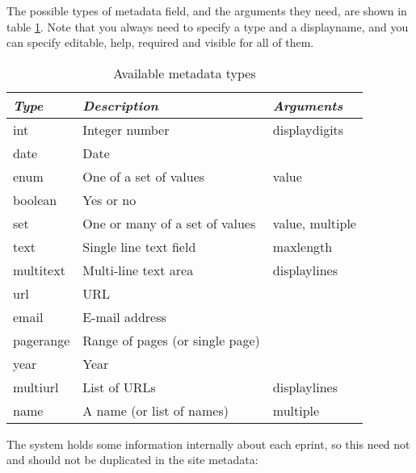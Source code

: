 The possible types of metadata field, and the arguments they need, are shown in table \ref{install_meta_types}. Note that you always need to specify a type and a displayname, and you can specify editable, help, required and visible for all of them.

\begin{table}
\begin{center}
\begin{tabular}{|l|l|l|}
\hline
\emph{Type} & \emph{Description}              & \emph{Arguments} \\
\hline
int         & Integer number                  & displaydigits    \\
date        & Date                            &                  \\
enum        & One of a set of values          & value            \\
boolean     & Yes or no                       &                  \\
set         & One or many of a set of values  & value, multiple  \\
text        & Single line text field          & maxlength        \\
multitext   & Multi-line text area            & displaylines     \\
url         & URL                             &                  \\
email       & E-mail address                  &                  \\
pagerange   & Range of pages (or single page) &                  \\
year        & Year                            &                  \\
multiurl    & List of URLs                    & displaylines     \\
name        & A name (or list of names)       & multiple         \\
\hline
\end{tabular}
\caption{\label{install_meta_types} Available metadata types}
\end{center}
\end{table}

The system holds some information internally about each eprint, so this need not and should not be duplicated in the site metadata:

